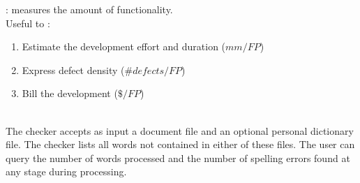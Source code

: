  : measures the amount of functionality.\\
Useful to : 
\begin{enumerate}
    \item Estimate the development effort and duration ($mm/FP$)
    \item Express defect density ($\#defects/FP$)
    \item Bill the development ($\$/FP$)
\end{enumerate}

\newpage
{}\\
The checker accepts as input a document file and an optional personal dictionary file. The checker lists all words not contained in either of these files. The user can query the number of words processed and the number of spelling errors found at any stage during processing.

